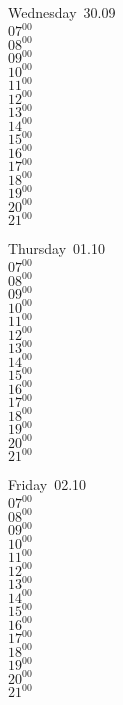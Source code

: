 \documentclass[11pt,a4paper]{book}\usepackage[]{graphicx}\usepackage[]{color}
\begin{document}
\begin{weekdaybox}
  Wednesday~30.09\\
  { 
  \vfill
  $07^{00}$\\
$08^{00}$\\
$09^{00}$\\
$10^{00}$\\
$11^{00}$\\
$12^{00}$\\
$13^{00}$\\
$14^{00}$\\
$15^{00}$\\
$16^{00}$\\
$17^{00}$\\
$18^{00}$\\
$19^{00}$\\
$20^{00}$\\
$21^{00}$\\
  }
\end{weekdaybox}
\clearpage
\begin{headerbox}
\end{headerbox}
\begin{weekdaybox}
  Thursday~01.10\\
  { 
  \vfill
  $07^{00}$\\
$08^{00}$\\
$09^{00}$\\
$10^{00}$\\
$11^{00}$\\
$12^{00}$\\
$13^{00}$\\
$14^{00}$\\
$15^{00}$\\
$16^{00}$\\
$17^{00}$\\
$18^{00}$\\
$19^{00}$\\
$20^{00}$\\
$21^{00}$\\
  }
\end{weekdaybox} 
\begin{weekdaybox}
  Friday~02.10\\
  { 
  \vfill
  $07^{00}$\\
$08^{00}$\\
$09^{00}$\\
$10^{00}$\\
$11^{00}$\\
$12^{00}$\\
$13^{00}$\\
$14^{00}$\\
$15^{00}$\\
$16^{00}$\\
$17^{00}$\\
$18^{00}$\\
$19^{00}$\\
$20^{00}$\\
$21^{00}$\\
  }
\end{weekdaybox}
\end{document}
